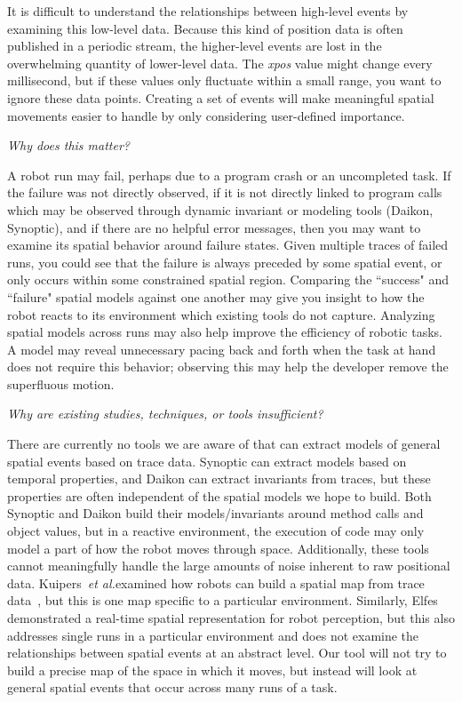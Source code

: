 \documentclass{article}
\newcommand\etal{\emph{et al.}}
\begin{document}
It is difficult to understand the relationships between high-level events by examining this low-level data.  
Because this kind of position data is often published in a periodic stream, the higher-level events are lost in the overwhelming quantity of lower-level data.
The \emph{xpos} value might change every millisecond, but if these values only fluctuate within a small range, you want to ignore these data points.  
Creating a set of events will make meaningful spatial movements easier to handle by only considering user-defined importance.  

\emph{Why does this matter?}  

A robot run may fail, perhaps due to a program crash or an uncompleted task.  
If the failure was not directly observed, if it is not directly linked to program calls which may be observed through dynamic invariant or modeling tools (Daikon, Synoptic), and if there are no helpful error messages, then you may want to examine its spatial behavior around failure states.
Given multiple traces of failed runs, you could see that the failure is always preceded by some spatial event, or only occurs within some constrained spatial region.
Comparing the ``success" and ``failure" spatial models against one another may give you insight to how the robot reacts to its environment which existing tools do not capture.
Analyzing spatial models across runs may also help improve the efficiency of robotic tasks.  
A model may reveal unnecessary pacing back and forth when the task at hand does not require this behavior; observing this may help the developer remove the superfluous motion.

\emph{Why are existing studies, techniques, or tools insufficient?}

There are currently no tools we are aware of that can extract models of general spatial events based on trace data. 
Synoptic can extract models based on temporal properties, and Daikon can extract invariants from traces, but these properties are often independent of the spatial models we hope to build.
Both Synoptic and Daikon build their models/invariants around method calls and object values, but in a reactive environment, the execution of code may only model a part of how the robot moves through space.
Additionally, these tools cannot meaningfully handle the large amounts of noise inherent to raw positional data.
Kuipers~\etal examined how robots can build a spatial map from trace data~\cite{kuipers1988robust}, but this is one map specific to a particular environment.
Similarly, Elfes~\cite{elfes2013occupancy} demonstrated a real-time spatial representation for robot perception, but this also addresses single runs in a particular environment and does not examine the relationships between spatial events at an abstract level.
Our tool will not try to build a precise map of the space in which it moves, but instead will look at general spatial events that occur across many runs of a task.
\end{document}
